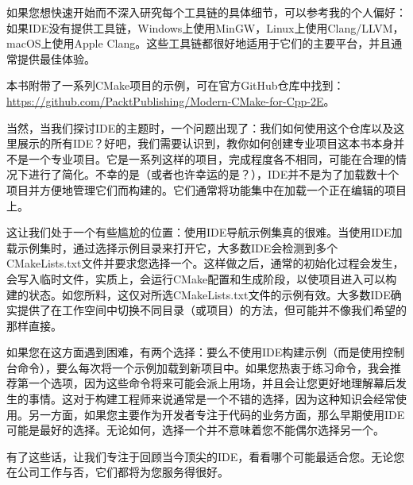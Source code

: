 如果您想快速开始而不深入研究每个工具链的具体细节，可以参考我的个人偏好：如果IDE没有提供工具链，Windows上使用MinGW，Linux上使用Clang/LLVM，macOS上使用Apple Clang。这些工具链都很好地适用于它们的主要平台，并且通常提供最佳体验。


本书附带了一系列CMake项目的示例，可在官方GitHub仓库中找到：\url{https://github.com/PacktPublishing/Modern-CMake-for-Cpp-2E}。

当然，当我们探讨IDE的主题时，一个问题出现了：我们如何使用这个仓库以及这里展示的所有IDE？好吧，我们需要认识到，教你如何创建专业项目这本书本身并不是一个专业项目。它是一系列这样的项目，完成程度各不相同，可能在合理的情况下进行了简化。不幸的是（或者也许幸运的是？），IDE并不是为了加载数十个项目并方便地管理它们而构建的。它们通常将功能集中在加载一个正在编辑的项目上。

这让我们处于一个有些尴尬的位置：使用IDE导航示例集真的很难。当使用IDE加载示例集时，通过选择示例目录来打开它，大多数IDE会检测到多个CMakeLists.txt文件并要求您选择一个。这样做之后，通常的初始化过程会发生，会写入临时文件，实质上，会运行CMake配置和生成阶段，以使项目进入可以构建的状态。如您所料，这仅对所选CMakeLists.txt文件的示例有效。大多数IDE确实提供了在工作空间中切换不同目录（或项目）的方法，但可能并不像我们希望的那样直接。

如果您在这方面遇到困难，有两个选择：要么不使用IDE构建示例（而是使用控制台命令），要么每次将一个示例加载到新项目中。如果您热衷于练习命令，我会推荐第一个选项，因为这些命令将来可能会派上用场，并且会让您更好地理解幕后发生的事情。这对于构建工程师来说通常是一个不错的选择，因为这种知识会经常使用。另一方面，如果您主要作为开发者专注于代码的业务方面，那么早期使用IDE可能是最好的选择。无论如何，选择一个并不意味着您不能偶尔选择另一个。

有了这些话，让我们专注于回顾当今顶尖的IDE，看看哪个可能最适合您。无论您在公司工作与否，它们都将为您服务得很好。









